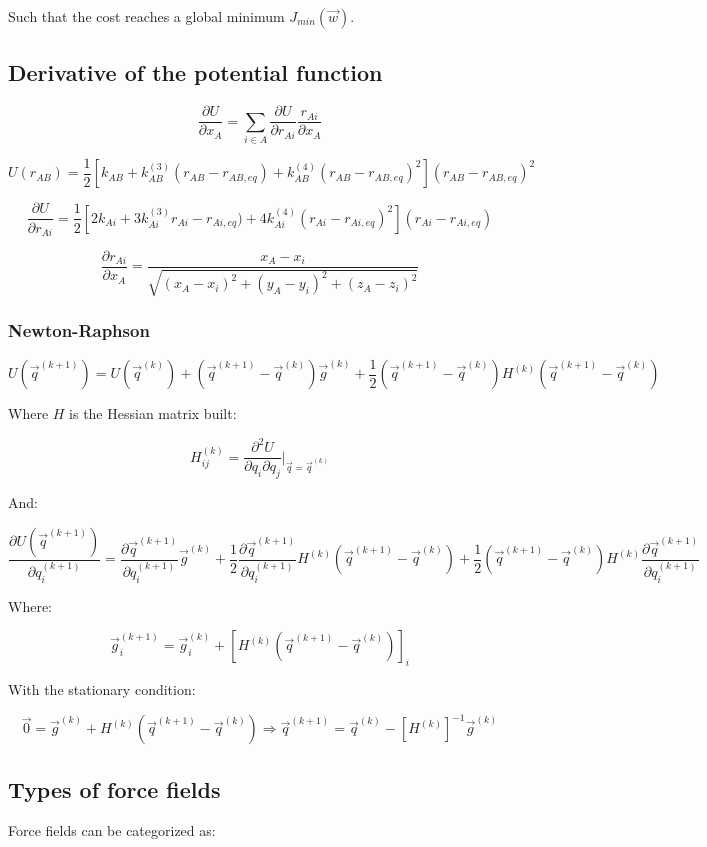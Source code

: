 	Such that the cost reaches a global minimum $J_{min}(\vec{w})$.

	\subsection{Derivative of the potential function}

	$$\frac{\partial U}{\partial x_A} = \sum\limits_{i\in A}\frac{\partial U}{\partial r_{Ai}}\frac{r_{Ai}}{\partial x_A}$$

	$$U(r_{AB}) = \frac{1}{2}[k_{AB}+k_{AB}^{(3)}(r_{AB}-r_{AB, eq}) + k_{AB}^{(4)}(r_{AB}-r_{AB, eq})^2](r_{AB}-r_{AB,eq})^2$$

	$$\frac{\partial U}{\partial r_{Ai}} = \frac{1}{2}[2k_{Ai}+3k_{Ai}^{(3)}r_{Ai}-r_{Ai, eq}) + 4k^{(4)}_{Ai}(r_{Ai}-r_{Ai, eq})^2](r_{Ai}-r_{Ai, eq})$$

	$$\frac{\partial r_{Ai}}{\partial x_A} = \frac{x_A-x_i}{\sqrt{(x_A-x_i)^2+(y_A-y_i)^2+(z_A-z_i)^2}}$$

		\subsubsection{Newton-Raphson}

		$$U(\vec{q}^{(k+1)}) = U(\vec{q}^{(k)}) + (\vec{q}^{(k+1)} -\vec{q}^{(k)})\vec{g}^{(k)} + \frac{1}{2}(\vec{q}^{(k+1)}-\vec{q}^{(k)})H^{(k)}(\vec{q}^{(k+1)}-\vec{q}^{(k)})$$

		Where $H$ is the Hessian matrix built:

		$$H_{ij}^{(k)} = \frac{\partial^2 U}{\partial q_i\partial q_j}|_{\vec{q}=\vec{q}^{(k)}}$$

		And:

		$$\frac{\partial U(\vec{q}^{(k+1)})}{\partial q_i^{(k+1)}} = \frac{\partial \vec{q}^{(k+1)}}{\partial q_i^{(k+1)}}\vec{g}^{(k)}+ \frac{1}{2}\frac{\partial \vec{q}^{(k+1)}}{\partial q_i^{(k+1)}}H^{(k)}(\vec{q}^{(k+1)}-\vec{q}^{(k)})+\frac{1}{2}(\vec{q}^{(k+1)}-\vec{q}^{(k)})H^{(k)}\frac{\partial \vec{q}^{(k+1)}}{\partial q_i^{(k+1)}}$$

		Where:

		$$\vec{g}_i^{(k+1)} = \vec{g}_i^{(k)} + [H^{(k)}(\vec{q}^{(k+1)}-\vec{q}^{(k)})]_i$$

		With the stationary condition:

		$$\vec{0} = \vec{g}^{(k)} + H^{(k)}(\vec{q}^{(k+1)}-\vec{q}^{(k)})\Rightarrow \vec{q}^{(k+1)} = \vec{q}^{(k)} - [H^{(k)}]^{-1}\vec{g}^{(k)}$$

	\subsection{Types of force fields}
	Force fields can be categorized as:

